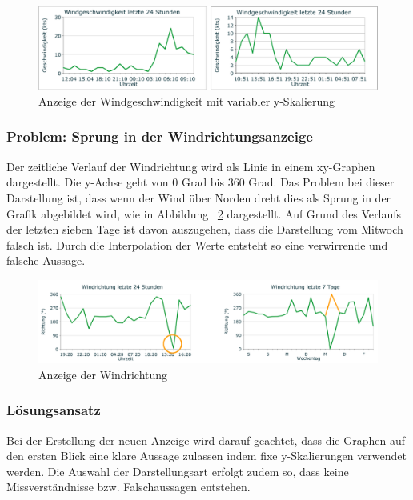 \begin{figure}[h!]
	\centering
	\includegraphics[width=1\linewidth]{img/wind-geschw}
	\caption{Anzeige der Windgeschwindigkeit mit variabler y-Skalierung}
	\label{img:wind-geschw}
\end{figure}

\subsubsection*{Problem: Sprung in der Windrichtungsanzeige}
Der zeitliche Verlauf der Windrichtung wird als Linie in einem xy-Graphen dargestellt. Die y-Achse geht von 0 Grad bis 360 Grad. Das Problem bei dieser Darstellung ist, dass wenn der Wind über Norden dreht dies als Sprung in der Grafik abgebildet wird, wie in Abbildung~ \ref{img:wind-richtung} dargestellt. Auf Grund des Verlaufs der letzten sieben Tage ist davon auszugehen, dass die Darstellung vom Mitwoch falsch ist. Durch die Interpolation der Werte entsteht so eine verwirrende und falsche Aussage.

\begin{figure}[h!]
	\centering
	\includegraphics[width=1\linewidth]{img/wind-richtung}
	\caption{Anzeige der Windrichtung}
	\label{img:wind-richtung}
\end{figure}

\subsubsection*{Lösungsansatz}
Bei der Erstellung der neuen Anzeige wird darauf geachtet, dass die Graphen auf den ersten Blick eine klare Aussage zulassen indem fixe y-Skalierungen verwendet werden. Die Auswahl der Darstellungsart erfolgt zudem so, dass keine Missverständnisse bzw. Falschaussagen entstehen.



